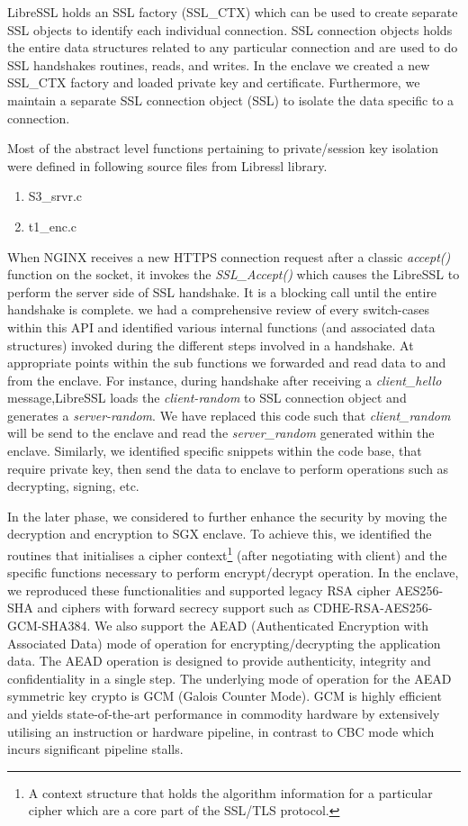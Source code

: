 \documentclass[../main.tex]{subfiles}
\begin{document}
LibreSSL holds an SSL factory (SSL_CTX) which can be used to create separate SSL objects
to identify each individual connection. SSL connection objects holds the entire 
data structures related to any particular connection and are used to do SSL handshakes
routines, reads, and writes. In the enclave we created a new SSL_CTX factory and loaded
private key and certificate. Furthermore, we maintain a separate SSL connection object (SSL)
to isolate the data specific to a connection.   
 
Most of the abstract level functions pertaining to private/session key isolation were defined  
in following source files from Libressl library.
\begin{enumerate}
  \item S3_srvr.c
  \item t1_enc.c
\end{enumerate}
 
When NGINX receives a new HTTPS connection request after a classic \textit{accept()} function 
on the socket, it invokes the \textit{SSL_Accept()} which causes the LibreSSL to perform the 
server side of SSL handshake. It is a blocking call until the entire handshake is complete. 
we had a comprehensive review of every switch-cases within this API and identified various 
internal functions (and associated data structures) invoked during the different steps 
involved in a handshake. At appropriate points within the sub functions we forwarded and read 
data to and from the enclave. For instance, during handshake after receiving a \textit{client_hello}
message,LibreSSL loads the \textit{client-random} to SSL connection object and generates a \textit{server-random}. 
We have replaced this code such that \textit{client_random} will be send to the enclave and read
the \textit{server_random} generated within the enclave. Similarly, we identified specific snippets within
the code base, that require private key, then send the data to enclave to perform operations such as 
decrypting, signing, etc. 

In the later phase, we considered to further enhance the security by moving the decryption and encryption
to SGX enclave. To achieve this, we identified the routines that initialises a cipher context\footnote{A 
context structure that holds the algorithm information for a particular cipher which are a core part
of the SSL/TLS protocol.} (after negotiating with client) and the specific functions necessary
to perform encrypt/decrypt operation. In the enclave, we reproduced these functionalities and 
supported legacy RSA cipher AES256-SHA and ciphers with forward secrecy support such as 
CDHE-RSA-AES256-GCM-SHA384. We also support the AEAD (Authenticated Encryption with Associated Data)
mode of operation for encrypting/decrypting the application data. The AEAD operation is designed to 
provide authenticity, integrity and confidentiality in a single step. The underlying mode of operation
for the AEAD symmetric key crypto is GCM (Galois Counter Mode). GCM is highly efficient and yields 
state-of-the-art performance in commodity hardware by extensively utilising an instruction or 
hardware pipeline, in contrast to CBC mode which incurs significant pipeline stalls.
\end{document}
